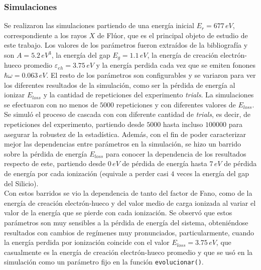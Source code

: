 \subsubsection{Simulaciones}
\noindent Se realizaron las simulaciones partiendo de una energía inicial $E_{r} = 677\,\si{eV}$, correspondiente a los rayos $X$ de Flúor, que es el principal objeto de estudio de este trabajo. Los valores de los parámetros fueron extraídos de la bibliografía y son $A = 5.2\,\si{eV}^{3}$, la energía del gap $E_{g} = 1.1\,\si{eV}$, la energía de creación electrón-hueco promedio $\varepsilon_{eh} = 3.75\,\si{eV}$ y la energía perdida cada vez que se emiten fonones $\hbar \omega = 0.063\,\si{eV}$. El resto de los parámetros son configurables y se variaron para ver los diferentes resultados de la simulación, como ser la pérdida de energía al ionizar $E_{loss}$ y la cantidad de repeticiones del experimento \textit{trials}. La simulaciones se efectuaron con no menos de $5000$ repeticiones y con diferentes valores de $E_{loss}$.\\
\indent Se simuló el proceso de cascada con con diferente cantidad de \textit{trials}, es decir, de repeticiones del experimento, partiendo desde $5000$ hasta incluso $100000$ para asegurar la robustez de la estadística. Además, con el fin de poder caracterizar mejor las dependencias entre parámetros en la simulación, se hizo un barrido sobre la pérdida de energía $E_{loss}$ para conocer la dependencia de los resultados respecto de este, partiendo desde $0\,\si{eV}$ de pérdida de energía hasta $7\,\si{eV}$ de pérdida de energía por cada ionización (equivale a perder casi $4$ veces la energía del gap del Silicio).\\
\indent Con estos barridos se vio la dependencia de tanto del factor de Fano, como de la energía de creación electrón-hueco y del valor medio de carga ionizada al variar el valor de la energía que se pierde con cada ionización. Se observó que estos parámetros son muy sensibles a la pérdida de energía del sistema, obteniéndose resultados con cambios de regímenes muy pronunciados, particularmente, cuando la energía perdida por ionización coincide con el valor $E_{loss} = 3.75\,\si{eV}$, que casualmente es la energía de creación electrón-hueco promedio y que se usó en la simulación como un parámetro fijo en la función \verb|evolucionar()|.


